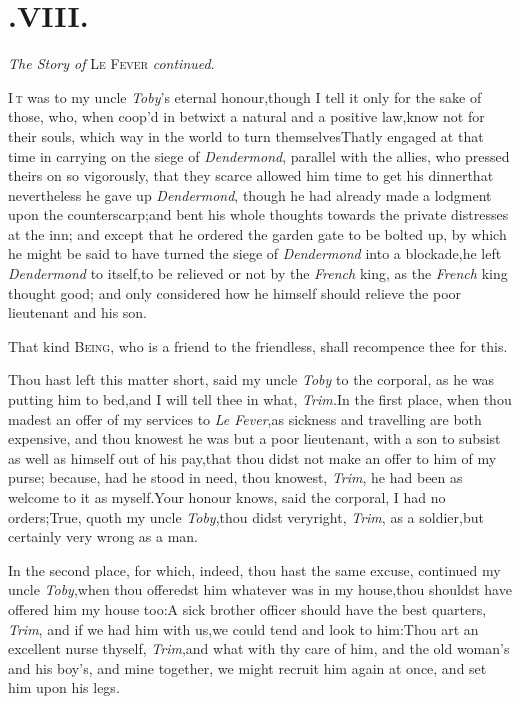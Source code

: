 \documentclass{article}
\begin{document}
\section{.\enspace VIII.}
\centerline{\textit{The Story of} \textsc{Le Fever} \textit{continued}.}

\lettrine{I}{\,t} was to my uncle
\textit{Toby}’s eternal honour,\tsh though I tell it
only for the sake of those, who, when coop’d in betwixt a
natural and a positive law,\pb know not for their souls, which way in
the world to turn themselves\tsk That\break{}\break ly engaged at that time in carrying on
the siege of \textit{Dendermond}, parallel with the allies, who
pressed theirs on so vigorously, that they scarce allowed him time
to get his dinner\tsh that nevertheless he gave up
\textit{Dendermond}, though he had already made a lodgment upon the
counterscarp;\tsh and bent his whole thoughts towards the private
distresses at the inn; and except that he ordered the garden gate
to be bolted up, by which he might be said to have turned the siege
of \textit{Dendermond} into a blockade,\tsk he left
\textit{Dendermond} to itself,\tsk to be relieved or not by the \textit{French} king, as the
\textit{French} king thought good; and only considered how he himself
should relieve the poor lieutenant and his son.

\tsh That kind \textsc{Being}, who is a friend to
the friendless, shall recompence thee for this.

Thou hast left this matter short, said my uncle \textit{Toby} to
the corporal, as he was putting him to bed,\tsh and I will
tell thee in what, \textit{Trim.}\tsh In the first place,
when thou madest an offer of my services to \textit{Le
Fever},\tsh as sickness and travelling are both
expensive, and thou knowest he was but a poor lieutenant, with a
son to subsist as well as himself out of his pay,\tsk that thou
didst not make an offer to him of my purse; because, had he stood
in need, thou knowest, \textit{Trim}, he had been as welcome to it as
myself.\tsh Your honour knows, said the corporal, I had no
orders;\tsh True, quoth my uncle \textit{Toby},\tsk thou
didst very\pb right, \textit{Trim}, as a soldier,\tsk but certainly
very wrong as a man.

In the second place, for which, indeed, thou hast the same
excuse, continued my uncle \textit{Toby},\tsh when thou
offeredst him whatever was in my house,\tsk thou shouldst
have offered him my house too:\break\tsh A sick brother officer
should have the best quarters, \textit{Trim}, and if we had him with
us,\tsk we could tend and look to him:\tsh Thou art an
excellent nurse thyself, \textit{Trim},\tsk and what with thy care
of him, and the old woman’s and his boy’s, and mine
together, we might recruit him again at once, and set him upon his
legs.\tsh
\end{document}
